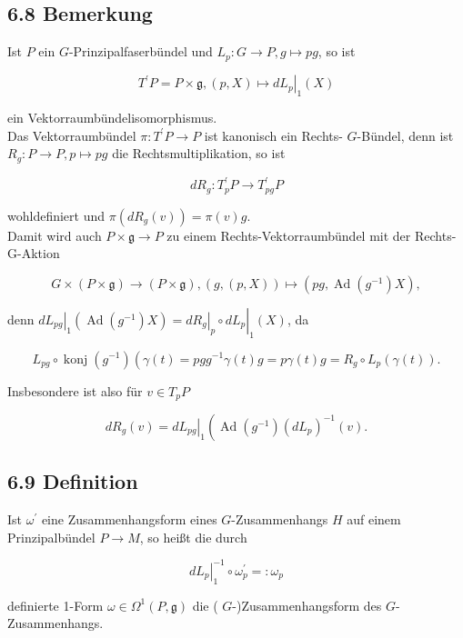 \subsection*{6.8 Bemerkung}
Ist $P$ ein $G$-Prinzipalfaserbündel und $L_{p}: G \rightarrow P, g \mapsto p g$, so ist

$$
T^{\prime} P=P \times \mathfrak{g},\left.(p, X) \mapsto d L_{p}\right|_{1}(X)
$$

ein Vektorraumbündelisomorphismus.\\
Das Vektorraumbündel $\pi: T^{\prime} P \rightarrow P$ ist kanonisch ein Rechts- $G$-Bündel, denn ist $R_{g}: P \rightarrow P, p \mapsto p g$ die Rechtsmultiplikation, so ist

$$
d R_{g}: T_{p}^{\prime} P \rightarrow T_{p g}^{\prime} P
$$

wohldefiniert und $\pi\left(d R_{g}(v)\right)=\pi(v) g$.\\
Damit wird auch $P \times \mathfrak{g} \rightarrow P$ zu einem Rechts-Vektorraumbündel mit der Rechts-G-Aktion

$$
G \times(P \times \mathfrak{g}) \rightarrow(P \times \mathfrak{g}),(g,(p, X)) \mapsto\left(p g, \operatorname{Ad}\left(g^{-1}\right) X\right),
$$

denn $\left.d L_{p g}\right|_{1}\left(\operatorname{Ad}\left(g^{-1}\right) X\right)=\left.\left.d R_{g}\right|_{p} \circ d L_{p}\right|_{1}(X)$, da

$$
L_{p g} \circ \operatorname{konj}\left(g^{-1}\right)\left(\gamma(t)=p g g^{-1} \gamma(t) g=p \gamma(t) g=R_{g} \circ L_{p}(\gamma(t)) .\right.
$$

Insbesondere ist also für $v \in T_{p} P$


\begin{equation*}
d R_{g}(v)=\left.d L_{p g}\right|_{1}\left(\operatorname{Ad}\left(g^{-1}\right)\left(d L_{p}\right)^{-1}(v) .\right. \tag{*}
\end{equation*}


\subsection*{6.9 Definition}
Ist $\omega^{\prime}$ eine Zusammenhangsform eines $G$-Zusammenhangs $H$ auf einem Prinzipalbündel $P \rightarrow M$, so heißt die durch

$$
\left.d L_{p}\right|_{1} ^{-1} \circ \omega_{p}^{\prime}=: \omega_{p}
$$

definierte 1-Form $\omega \in \Omega^{1}(P, \mathfrak{g})$ die ( $G$-)Zusammenhangsform des $G$-Zusammenhangs.

